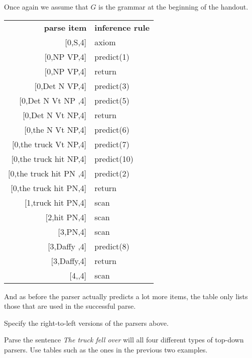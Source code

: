 \begin{examplebox}
    Once again we assume that $G$ is the grammar at the beginning of the handout.
    \begin{center}
        \begin{tabular}{r|l}
            \textbf{parse item} & \textbf{inference rule}\\
            $\lbrack$0,\psep S,4] & axiom\\
            $\lbrack$0,NP VP\psep,4] & predict(1)\\
            $\lbrack$0,\psep NP VP,4] & return\\
            $\lbrack$0,Det N \psep VP,4] & predict(3)\\
            $\lbrack$0,Det N Vt NP \psep,4] & predict(5)\\
            $\lbrack$0,\psep Det N Vt NP,4] & return\\
            $\lbrack$0,the \psep N Vt NP,4] & predict(6)\\
            $\lbrack$0,the truck \psep Vt NP,4] & predict(7)\\
            $\lbrack$0,the truck hit \psep NP,4] & predict(10)\\
            $\lbrack$0,the truck hit PN \psep,4] & predict(2)\\
            $\lbrack$0,\psep the truck hit PN,4] & return\\
            $\lbrack$1,\psep truck hit PN,4] & scan\\
            $\lbrack$2,\psep hit PN,4] & scan\\
            $\lbrack$3,\psep PN,4] & scan\\
            $\lbrack$3,Daffy \psep,4] & predict(8)\\
            $\lbrack$3,\psep Daffy,4] & return\\
            $\lbrack$4,\psep,4] & scan
        \end{tabular}
    \end{center}
    And as before the parser actually predicts a lot more items, the table only lists those that are used in the successful parse.
\end{examplebox}
\begin{exercise}
    Specify the right-to-left versions of the parsers above.
\end{exercise}
%
\begin{exercise}
    Parse the sentence \emph{The truck fell over} will all four different types of top-down parsers.
    Use tables such as the ones in the previous two examples.
\end{exercise}

